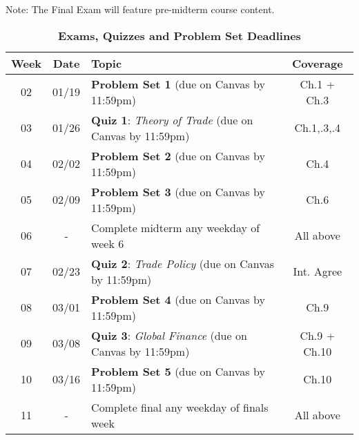 \documentclass[10pt]{article}
\newcommand{\ra}[1]{\renewcommand{\arraystretch}{#1}}
\begin{document}
Note: The Final Exam will feature pre-midterm course content.

\newpage

\begin{table}[h!]
	\caption*{\large\textbf{Exams, Quizzes and Problem Set Deadlines}}
	\centering
	\ra{1.5}
	\begin{tabular}{@{\extracolsep{0.5cm}} c c l c @{}}
		\toprule
		\textbf{Week} & \textbf{Date} & \textbf{Topic} & \textbf{Coverage}  \\ \toprule 
		02 & 01/19 & \textbf{Problem Set 1} (due on Canvas by 11:59pm) & Ch.1 + Ch.3  \\
		03 & 01/26 & \textbf{Quiz 1}: \textit{Theory of Trade} (due on Canvas by 11:59pm) & Ch.1,.3,.4  \\ 
		04 & 02/02 & \textbf{Problem Set 2} (due on Canvas by 11:59pm) & Ch.4 \\
		05 & 02/09 & \textbf{Problem Set 3} (due on Canvas by 11:59pm) & Ch.6 \\ 
		06 & - & Complete midterm any weekday of week 6 & All above\\
		07 & 02/23 & \textbf{Quiz 2}: \textit{Trade Policy} (due on Canvas by 11:59pm) & Int. Agree \\ 
		08 & 03/01 & \textbf{Problem Set 4} (due on Canvas by 11:59pm) &  Ch.9 \\
		09 & 03/08 & \textbf{Quiz 3}: \textit{Global Finance} (due on Canvas by 11:59pm)&  Ch.9 + Ch.10 \\ 
		10 & 03/16 & \textbf{Problem Set 5} (due on Canvas by 11:59pm)& Ch.10 \\
		11 & - & Complete final any weekday of finals week & All above \\  \bottomrule
	\end{tabular}
\end{table}
\end{document}
